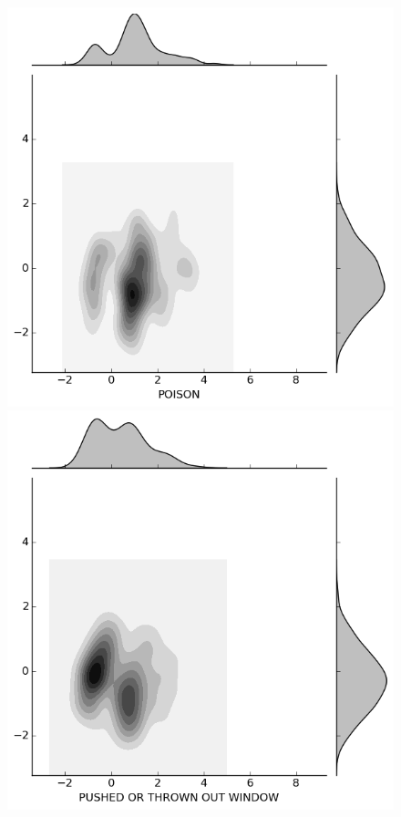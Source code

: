 \documentclass{evanarticle}
\begin{document}
\begin{figure}[H]
  \begin{minipage}[b]{0.20\linewidth}
    \includegraphics[width=\linewidth]{images/weapon/POISON.png}
  \end{minipage}
  \quad
  \begin{minipage}[b]{0.20\linewidth}
    \includegraphics[width=\linewidth]{images/weapon/PUSHED_OUT_WINDOW.png}

\end{minipage}
\end{figure}
\end{document}
